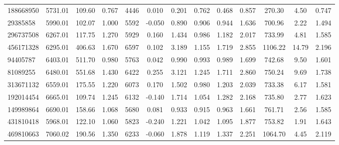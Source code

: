 \begin{sidewaystable}[htbp]
\begin{tabular}{lcccccccccccc}
 188668950 & 5731.01 & 109.60 & 0.767 & 4446 & 0.010 & 
        0.201 & 0.762 & 0.468 & 0.857 & 
        270.30 & 4.50 & 0.747 \\
 29385858 & 5990.01 & 102.07 & 1.000 & 5592 & -0.050 & 
        0.890 & 0.906 & 0.944 & 1.636 & 
        700.96 & 2.22 & 1.494 \\
 296737508 & 6267.01 & 117.75 & 1.270 & 5929 & 0.160 & 
        1.434 & 0.986 & 1.182 & 2.017 & 
        733.99 & 4.81 & 1.585 \\
 456171328 & 6295.01 & 406.63 & 1.670 & 6597 & 0.102 & 
        3.189 & 1.155 & 1.719 & 2.855 & 
        1106.22 & 14.79 & 2.196 \\
 94405787 & 6403.01 & 511.70 & 0.980 & 5763 & 0.042 & 
        0.990 & 0.993 & 0.989 & 1.699 & 
        742.68 & 9.50 & 1.601 \\
 81089255 & 6480.01 & 551.68 & 1.430 & 6422 & 0.255 & 
        3.121 & 1.245 & 1.711 & 2.860 & 
        750.24 & 9.69 & 1.738 \\
 313671132 & 6559.01 & 175.55 & 1.220 & 6073 & 0.170 & 
        1.502 & 0.980 & 1.203 & 2.039 & 
        733.38 & 6.17 & 1.581 \\
 192014454 & 6665.01 & 109.74 & 1.245 & 6132 & -0.140 & 
        1.714 & 1.054 & 1.282 & 2.168 & 
        735.80 & 2.77 & 1.623 \\
 149989864 & 6690.01 & 158.66 & 1.068 & 5680 & 0.081 & 
        0.933 & 0.915 & 0.963 & 1.661 & 
        761.71 & 2.56 & 1.585 \\
 431810418 & 5968.01 & 122.10 & 1.060 & 5823 & -0.240 & 
        1.221 & 1.042 & 1.095 & 1.877 & 
        753.82 & 1.91 & 1.643 \\
 469810663 & 7060.02 & 190.56 & 1.350 & 6233 & -0.060 & 
        1.878 & 1.119 & 1.337 & 2.251 & 
        1064.70 & 4.45 & 2.119 \\
        \bottomrule
    \end{tabular}
\end{sidewaystable}